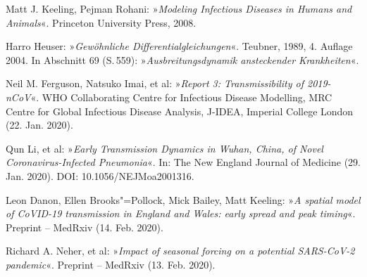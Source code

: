 \documentclass[a4paper,11pt,fleqn,twocolumn,twoside,dvipdfmx]{scrartcl}
\numberwithin{equation}{section}
\begin{document}
\clearpage
\twocolumn
\small

\begin{thebibliography}{00}
 Matt J. Keeling, Pejman Rohani:
»\emph{Modeling Infectious Diseases in Humans and Animals}«.
Princeton University Press, 2008.

 Harro Heuser: »\emph{Gewöhnliche Differentialgleichungen}«.
Teubner, 1989, 4. Auflage 2004. In Abschnitt 69 (S.\,559):
»\emph{Ausbreitungsdynamik ansteckender Krankheiten}«.

 Neil M. Ferguson, Natsuko Imai, et al:
»\emph{Report 3: Transmissibility of 2019-nCoV}«.
WHO Collaborating Centre for Infectious Disease Modelling, MRC Centre
for Global Infectious Disease Analysis, J-IDEA, Imperial College London
(22. Jan. 2020).

 Qun Li, et al: »\emph{Early Transmission Dynamics in
Wuhan, China, of Novel Coronavirus-Infected Pneumonia}«.
In: The New England Journal of Medicine (29. Jan. 2020).
DOI: 10.1056/NEJMoa2001316.

 Leon Danon, Ellen Brooks"=Pollock, Mick Bailey,
Matt Keeling:
»\emph{A spatial model of CoVID-19 transmission in England and Wales:
early spread and peak timing}«. Preprint -- MedRxiv (14. Feb. 2020).

 Richard A. Neher, et al: »\emph{Impact of seasonal
forcing on a potential SARS-CoV-2 pandemic}«.
Preprint -- MedRxiv (13. Feb. 2020).

\end{thebibliography}
\end{document}
